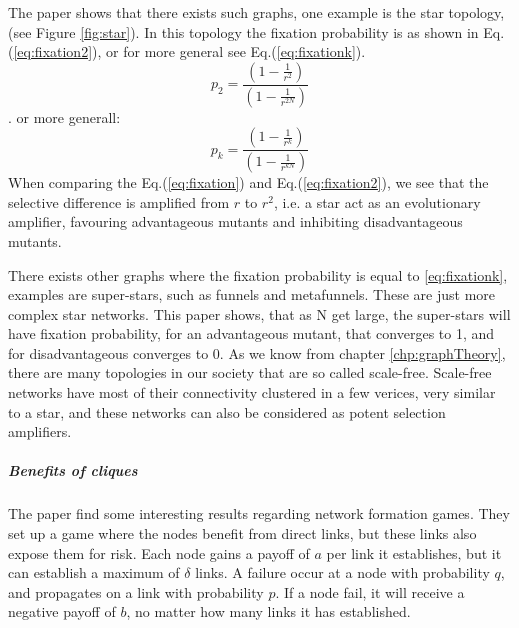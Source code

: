 The paper shows that there exists such graphs, one example is the star topology, (see Figure \ref{fig:star}).
In this topology the fixation probability is as shown in Eq.(\ref{eq:fixation2}), or for more general see Eq.(\ref{eq:fixationk}). \begin{equation}p_{2}=\frac{(1-\frac{1}{r^{2}})}{(1-\frac{1}{r^{2N}})} \label{eq:fixation2} \end{equation}.
or more generall: \begin{equation}
p_{k}=\frac{(1-\frac{1}{r^{k}})}{(1-\frac{1}{r^{kN}})} \label{eq:fixationk}
\end{equation}
 When comparing the Eq.(\ref{eq:fixation}) and Eq.(\ref{eq:fixation2}), we see that the selective difference is
 amplified from $r$ to $r^{2}$, i.e. a star act as an evolutionary amplifier, favouring advantageous
  mutants and inhibiting disadvantageous mutants.

There exists other graphs where the fixation probability is equal to \ref{eq:fixationk}, examples are super-stars, such as funnels and
metafunnels. These are just more complex star networks. This paper shows,  that as N get large, the super-stars will have fixation probability, for an advantageous mutant, that converges to 1, 
and for disadvantageous converges to 0. 
As we know from chapter \ref{chp:graphTheory}, there are many
topologies in our society that are so called scale-free. Scale-free networks have most of their connectivity clustered in a few verices, very similar to a star, and these networks can also be considered as potent selection amplifiers.
\subparagraph{Benefits of cliques}
The paper \cite{contagion} find some interesting results regarding network formation games. 
They set up a game where the nodes benefit from direct links, but these links also expose them for risk. 
Each node gains a payoff of  $a$ per link it establishes, but it can establish a maximum of $\delta$ links.
A failure occur at a node with probability $q$, and propagates on a link with probability $p$. If a node fail, it will receive a negative payoff of $b$, no matter how many links it has established.

